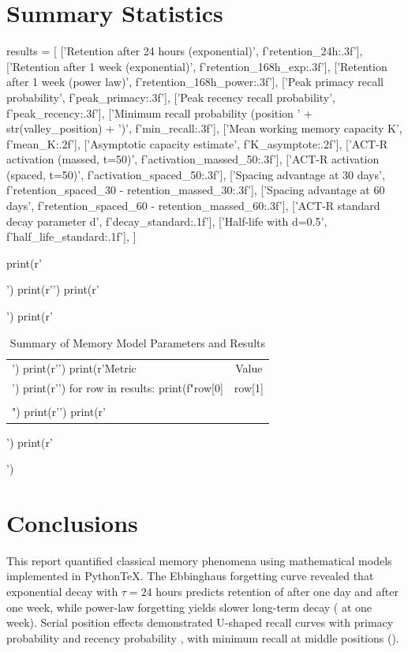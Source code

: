\documentclass[11pt,a4paper]{article}
\begin{document}
\section{Summary Statistics}

\begin{pycode}
results = [
    ['Retention after 24 hours (exponential)', f'{retention_24h:.3f}'],
    ['Retention after 1 week (exponential)', f'{retention_168h_exp:.3f}'],
    ['Retention after 1 week (power law)', f'{retention_168h_power:.3f}'],
    ['Peak primacy recall probability', f'{peak_primacy:.3f}'],
    ['Peak recency recall probability', f'{peak_recency:.3f}'],
    ['Minimum recall probability (position ' + str(valley_position) + ')', f'{min_recall:.3f}'],
    ['Mean working memory capacity K', f'{mean_K:.2f}'],
    ['Asymptotic capacity estimate', f'{K_asymptote:.2f}'],
    ['ACT-R activation (massed, t=50)', f'{activation_massed_50:.3f}'],
    ['ACT-R activation (spaced, t=50)', f'{activation_spaced_50:.3f}'],
    ['Spacing advantage at 30 days', f'{retention_spaced_30 - retention_massed_30:.3f}'],
    ['Spacing advantage at 60 days', f'{retention_spaced_60 - retention_massed_60:.3f}'],
    ['ACT-R standard decay parameter d', f'{decay_standard:.1f}'],
    ['Half-life with d=0.5', f'{half_life_standard:.1f}'],
]

print(r'\begin{table}[H]')
print(r'\centering')
print(r'\caption{Summary of Memory Model Parameters and Results}')
print(r'\begin{tabular}{@{}lc@{}}')
print(r'\toprule')
print(r'Metric & Value \\')
print(r'\midrule')
for row in results:
    print(f"{row[0]} & {row[1]} \\\\")
print(r'\bottomrule')
print(r'\end{tabular}')
print(r'\end{table}')
\end{pycode}

\section{Conclusions}

This report quantified classical memory phenomena using mathematical models implemented in PythonTeX. The Ebbinghaus forgetting curve revealed that exponential decay with $\tau = 24$ hours predicts retention of  after one day and  after one week, while power-law forgetting yields slower long-term decay ( at one week). Serial position effects demonstrated U-shaped recall curves with primacy probability  and recency probability , with minimum recall at middle positions ().
\end{document}
